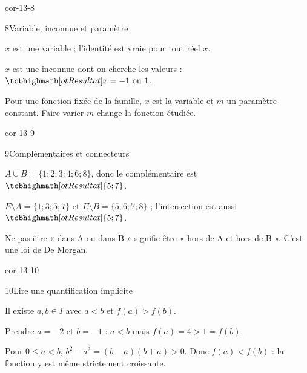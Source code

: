 \begin{blocLivre}{cor-13-8}
\begin{corrige}{8}{Variable, inconnue et paramètre}
\begin{questions}
\item $x$ est une variable ; l’identité est vraie pour tout réel $x$.
\item $x$ est une inconnue dont on cherche les valeurs : $\res{x=-1\text{ ou }1}$.
\item Pour une fonction fixée de la famille, $x$ est la variable et $m$ un paramètre constant. Faire varier $m$ change la fonction étudiée.
\end{questions}
\end{corrige}
\end{blocLivre}
\begin{blocLivre}{cor-13-9}
\begin{corrige}{9}{Complémentaires et connecteurs}
\begin{questions}
\item $A\cup B=\{1;2;3;4;6;8\}$, donc le complémentaire est $\res{\{5;7\}}$.
\item $E\setminus A=\{1;3;5;7\}$ et $E\setminus B=\{5;6;7;8\}$ ; l’intersection est aussi $\res{\{5;7\}}$.
\item Ne pas être « dans A ou dans B » signifie être « hors de A et hors de B ». C’est une loi de De Morgan.
\end{questions}
\label{figlivre-r13-09-venn-cor}

\end{corrige}
\end{blocLivre}
\begin{blocLivre}{cor-13-10}
\begin{corrige}{10}{Lire une quantification implicite}
\begin{questions}
\item Il existe $a,b\in I$ avec $a<b$ et $f(a)>f(b)$.
\item Prendre $a=-2$ et $b=-1$ : $a<b$ mais $f(a)=4>1=f(b)$.
\item Pour $0\leq a<b$, $b^2-a^2=(b-a)(b+a)>0$. Donc $f(a)<f(b)$ : la fonction y est même strictement croissante.
\end{questions}
\end{corrige}
\end{blocLivre}
